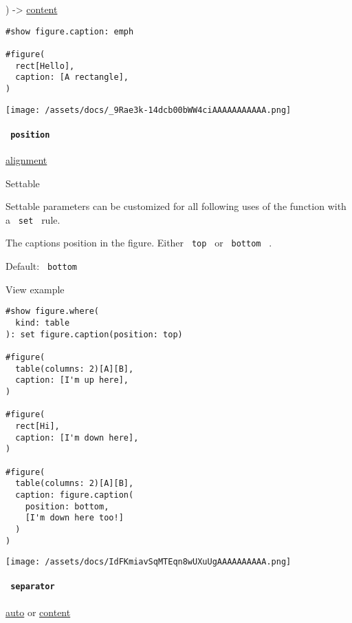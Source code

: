 ) -\textgreater{} \href{/docs/reference/foundations/content/}{content}

\begin{verbatim}
#show figure.caption: emph

#figure(
  rect[Hello],
  caption: [A rectangle],
)
\end{verbatim}

\texttt{[image: /assets/docs/\_9Rae3k-14dcb00bWW4ciAAAAAAAAAAA.png]}

\paragraph{\texorpdfstring{\texttt{\ position\ }}{ position }}\label{definitions-caption-position}

\href{/docs/reference/layout/alignment/}{alignment}

{{ Settable }}

\label{definitions-caption-position-settable-tooltip}
Settable parameters can be customized for all following uses of the
function with a \texttt{\ set\ } rule.

The caption\textquotesingle s position in the figure. Either
\texttt{\ top\ } or \texttt{\ bottom\ } .

Default: \texttt{\ bottom\ }


View example

\begin{verbatim}
#show figure.where(
  kind: table
): set figure.caption(position: top)

#figure(
  table(columns: 2)[A][B],
  caption: [I'm up here],
)

#figure(
  rect[Hi],
  caption: [I'm down here],
)

#figure(
  table(columns: 2)[A][B],
  caption: figure.caption(
    position: bottom,
    [I'm down here too!]
  )
)
\end{verbatim}

\texttt{[image: /assets/docs/IdFKmiavSqMTEqn8wUXuUgAAAAAAAAAA.png]}

\paragraph{\texorpdfstring{\texttt{\ separator\ }}{ separator }}\label{definitions-caption-separator}

\href{/docs/reference/foundations/auto/}{auto} {or}
\href{/docs/reference/foundations/content/}{content}

